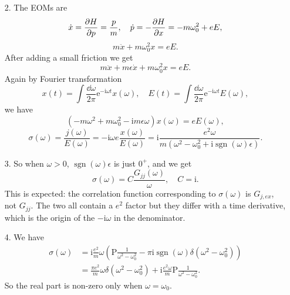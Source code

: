 \documentclass[hyperref, a4paper]{article}
\DeclareMathOperator{\sgn}{sgn}
\newcommand*{\ii}{\mathrm{i}}
\newcommand*{\ee}{\mathrm{e}}
\begin{document}
\begin{itemize}
\item[2.] The EOMs are 
\[
    \dot{x} = \pdv{H}{p} = \frac{p}{m}, \quad \dot{p} = - \pdv{H}{x} = - m \omega_0^2 + eE,
\]
\[
    m\ddot{x} + m \omega_0^2 x = e E.
\]
After adding a small friction we get 
\begin{equation}
    m\ddot{x} + m \epsilon \dot{x} + m \omega_0^2 x = e E.
\end{equation}
Again by Fourier transformation
\[
    x(t) = \int \frac{\dd{\omega}}{2\pi} \ee^{- \ii \omega t} x(\omega), \quad 
    E(t) = \int \frac{\dd{\omega}}{2\pi} \ee^{- \ii \omega t} E(\omega),
\] 
we have 
\[
    (- m \omega^2 + m \omega_0^2 - \ii m \epsilon \omega) x(\omega) = e E(\omega),
\]
\begin{equation}
    \sigma(\omega) = \frac{j(\omega)}{E(\omega)} = - \ii \omega e \frac{x(\omega)}{E(\omega)}
    = \ii \frac{e^2 \omega}{m (\omega^2 - \omega_0^2 + \ii \sgn(\omega) \epsilon)}.
\end{equation}

\item[3.] So when $\omega > 0$, $\sgn(\omega) \epsilon$ is just $0^+$, and we get 
\begin{equation}
    \sigma(\omega) = C \frac{G_{jj} (\omega)}{\omega}, \quad C = \ii.
\end{equation}
This is expected: the correlation function corresponding to $\sigma(\omega)$ is $G_{j, ex}$,
not $G_{jj}$.
The two all contain a $e^2$ factor but they differ with a time derivative,
which is the origin of the $- \ii \omega$ in the denominator.

\item[4.] We have 
\begin{equation}
    \begin{aligned}
        \sigma(\omega) &= \ii \frac{e^2}{m} \omega \left(
            \mathrm{P} \frac{1}{\omega^2 - \omega_0^2} - \pi \ii \sgn(\omega) \delta(\omega^2 - \omega_0^2) 
        \right) \\
        &= \frac{\pi e^2}{m} \omega \delta (\omega^2 - \omega_0^2) 
        + \ii \frac{e^2 \omega}{m} \mathrm{P} \frac{1}{\omega^2 - \omega_0^2}.
    \end{aligned}
\end{equation}
So the real part is non-zero only when $\omega = \omega_0$.

\end{itemize}
\end{document}
